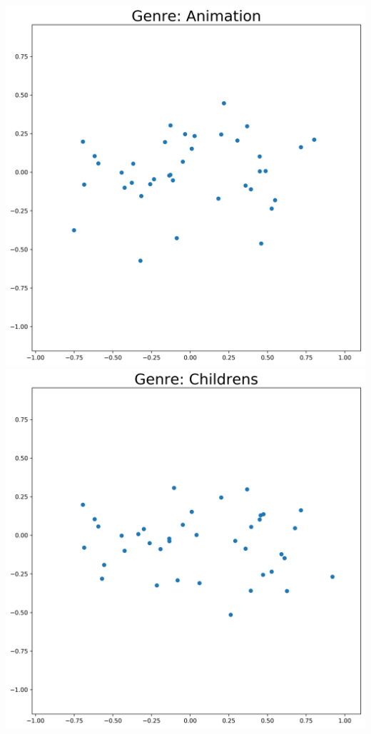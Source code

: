 \begin{appendices}
\begin{center}
\begin{minipage}{0.48\linewidth}
\includegraphics[scale=0.26]{"genres/Genre: Animation"} 
\includegraphics[scale=0.26]{"genres/Genre: Childrens"}  

\end{minipage}
\end{center}
\end{appendices}
